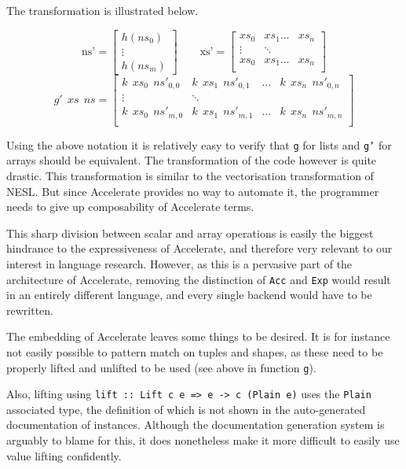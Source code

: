 The transformation is illustrated below.

\[
\textrm{ns'} =
\begin{bmatrix}
  h(ns_0) \\
  \vdots \\
  h(ns_m)
\end{bmatrix}
\qquad
\textrm{xs'} =
\begin{bmatrix}
  xs_0 & xs_1 \ldots & xs_n \\
  \vdots & \ddots \\
  xs_0 & xs_1 \ldots & xs_n \\
\end{bmatrix}
\]
\[
g'\ \ xs\ \ ns =
\begin{bmatrix}
  k\ \ xs_0\ \ ns'_{0,0} & k\ \ xs_1\ \ ns'_{0,1} & \ldots &  k\ \ xs_n\ \ ns'_{0,n}  \\
\vdots & \ddots \\
  k\ \ xs_0\ \ ns'_{m,0} & k\ \ xs_1\ \ ns'_{m,1}  & \ldots &  k\ \ xs_n\ \ ns'_{m,n}   \\
\end{bmatrix}
\]

Using the above notation it is relatively easy to verify that \texttt{g} for
lists and \texttt{g'} for arrays should be equivalent.  The transformation of
the code however is quite drastic.  This transformation is similar to the
vectorisation transformation of NESL\cite{nesl}.  But since Accelerate provides
no way to automate it, the programmer needs to give up composability of
Accelerate terms.

This sharp division between scalar and array operations is easily the biggest
hindrance to the expressiveness of Accelerate, and therefore very relevant to
our interest in language research. However, as this is a pervasive part of the
architecture of Accelerate, removing the distinction of \texttt{Acc} and
\texttt{Exp} would result in an entirely different language, and every single
backend would have to be rewritten.

The embedding of Accelerate leaves some things to be desired. It is for
instance not easily possible to pattern match on tuples and shapes, as these
need to be properly lifted and unlifted to be used (see above in function \texttt{g}).

Also, lifting using \texttt{lift :: Lift c e => e -> c (Plain e)} uses the
\texttt{Plain} associated type, the definition of which is not shown in the
auto-generated documentation of instances. Although the documentation
generation system is arguably to blame for this, it does nonetheless make it
more difficult to easily use value lifting confidently.

